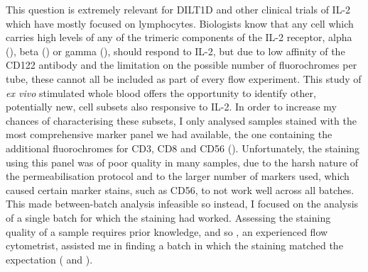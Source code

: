 This question is extremely relevant for DILT1D and other clinical trials of IL-2 which have mostly focused on lymphocytes.  %
Biologists know that any cell which carries high levels of any of the trimeric components of the IL-2 receptor,
alpha (), beta () or gamma (), should respond to IL-2,
but due to low affinity of the CD122 antibody and the limitation on the possible number of fluorochromes per tube, these cannot all be included as part of every flow experiment.  
This study of \emph{ex vivo} stimulated whole blood offers the opportunity to identify other, potentially new, cell subsets also responsive to IL-2.
In order to increase my chances of characterising these subsets, I only analysed samples stained with the most comprehensive marker panel we had available, the one containing the additional fluorochromes for CD3, CD8 and CD56 ().
Unfortunately, the staining using this panel was of poor quality in many samples, due to the harsh nature of the permeabilisation protocol and to the larger number of markers used, which caused certain marker stains, such as CD56, to not work well across all batches.
This made between-batch analysis infeasible so instead, I focused on the analysis of a single batch for which the staining had worked. %
Assessing the staining quality of a sample requires prior knowledge, and so , an experienced
flow cytometrist, assisted me in finding a batch in which the staining matched the expectation ( and ).

